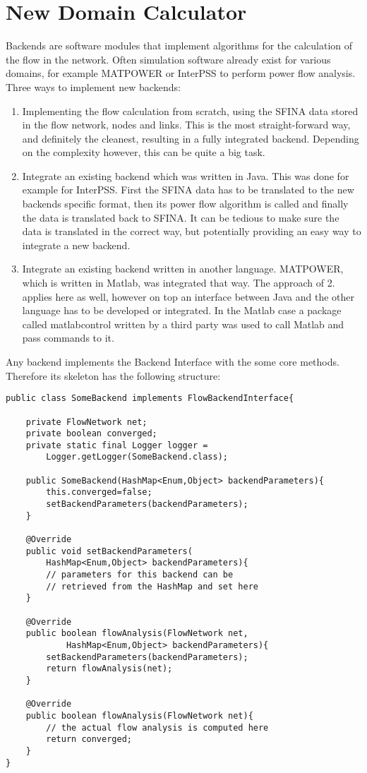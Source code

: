 \documentclass[11pt,fleqn]{book} %
\newcommand{\Backend}{Domain Calculator }
\begin{document}
\section{New \Backend}\label{sec:backend}
Backends are software modules that implement algorithms for the calculation of the flow in the network. Often simulation software already exist for various domains, for example MATPOWER or InterPSS to perform power flow analysis. Three ways to implement new backends:
\begin{enumerate}
	\item Implementing the flow calculation from scratch, using the SFINA data stored in the flow network, nodes and links. This is the most straight-forward way, and definitely the cleanest, resulting in a fully integrated backend. Depending on the complexity however, this can be quite a big task.
	\item Integrate an existing backend which was written in Java. This was done for example for InterPSS. First the SFINA data has to be translated to the new backends specific format, then its power flow algorithm is called and finally the data is translated back to SFINA. It can be tedious to make sure the data is translated in the correct way, but potentially providing an easy way to integrate a new backend.
	\item Integrate an existing backend written in another language. MATPOWER, which is written in Matlab, was integrated that way. The approach of 2. applies here as well, however on top an interface between Java and the other language has to be developed or integrated. In the Matlab case a package called matlabcontrol written by a third party was used to call Matlab and pass commands to it.
\end{enumerate}

Any backend implements the Backend Interface with the some core methods. Therefore its skeleton has the following structure:

\begin{lstlisting}[frame=single]
public class SomeBackend implements FlowBackendInterface{
    
    private FlowNetwork net;
    private boolean converged;
    private static final Logger logger = 
    	Logger.getLogger(SomeBackend.class);
    
    public SomeBackend(HashMap<Enum,Object> backendParameters){
        this.converged=false;
        setBackendParameters(backendParameters);
    }

    @Override
    public void setBackendParameters(
    	HashMap<Enum,Object> backendParameters){
        // parameters for this backend can be 
        // retrieved from the HashMap and set here
    }
    
    @Override
    public boolean flowAnalysis(FlowNetwork net, 
    		HashMap<Enum,Object> backendParameters){
        setBackendParameters(backendParameters);
        return flowAnalysis(net);
    }
    
    @Override
    public boolean flowAnalysis(FlowNetwork net){
        // the actual flow analysis is computed here
        return converged;
    }
}
\end{lstlisting}
\end{document}
